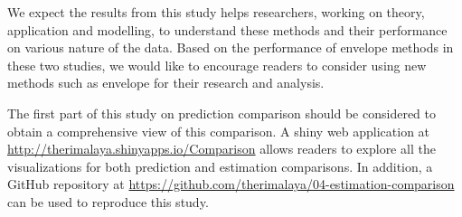 \documentclass[12pt,3p,authoryear]{elsarticle}
\begin{document}
We expect the results from this study helps researchers, working on theory, application and modelling, to understand these methods and their performance on various nature of the data. Based on the performance of envelope methods in these two studies, we would like to encourage readers to consider using new methods such as envelope for their research and analysis.

The first part of this study \citep{rimal2019pred} on prediction comparison should be considered to obtain a comprehensive view of this comparison. A shiny \citep{shiny} web application at \url{http://therimalaya.shinyapps.io/Comparison} allows readers to explore all the visualizations for both prediction and estimation comparisons. In addition, a GitHub repository at \url{https://github.com/therimalaya/04-estimation-comparison} can be used to reproduce this study.

\hypertarget{refs}{}


\renewcommand\refname{References}

\end{document}

